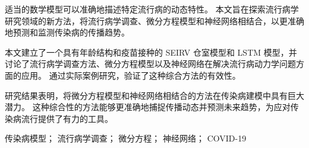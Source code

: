 \begin{abstract_cn}

	适当的数学模型可以准确地描述特定流行病的动态特性。
	本文旨在探索流行病学研究领域的新方法，将流行病学调查、微分方程模型和神经网络相结合，以更准确地预测和监测传染病的传播趋势。

	本文建立了一个具有年龄结构和疫苗接种的 SEIRV 仓室模型和 LSTM 模型，并讨论了流行病学调查方法、微分方程模型以及神经网络在解决流行病动力学问题方面的应用。
	通过实际案例研究，验证了这种综合方法的有效性。

	研究结果表明，将微分方程模型和神经网络相结合的方法在传染病建模中具有巨大潜力。
	这种综合性的方法能够更准确地捕捉传播动态并预测未来趋势，为应对传染病流行提供了有力的工具。
\end{abstract_cn}

\begin{keywords_cn}
	传染病模型；
	流行病学调查；
	微分方程；
	神经网络；
	COVID-19
\end{keywords_cn}